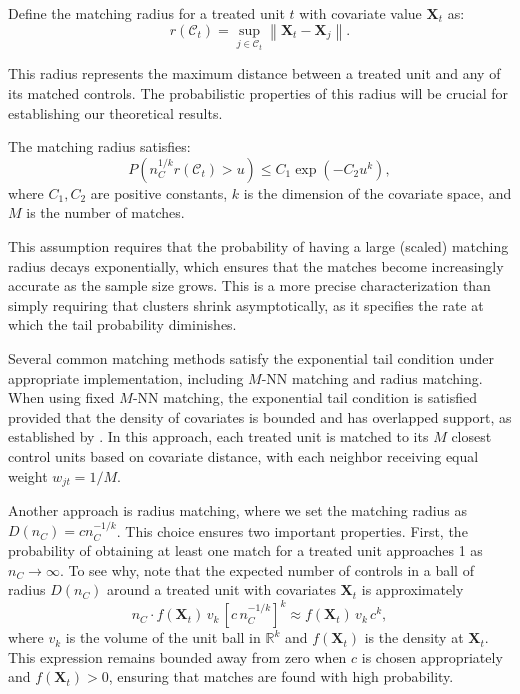 \documentclass{mytemplate}
\begin{document}
Define the matching radius for a treated unit $t$ with covariate value $\mathbf{X}_t$ as:
\[
r\left(\mathcal{C}_t\right)=\sup _{j \in \mathcal{C}_t}\left\|\mathbf{X}_t - \mathbf{X}_j\right\|.
\]

This radius represents the maximum distance between a treated unit and any of its matched controls. The probabilistic properties of this radius will be crucial for establishing our theoretical results.

\begin{assumption}
\label{assum:exponential-tail}
The matching radius satisfies:
\[
P\left(n_C^{1/k}r\left(\mathcal{C}_t\right) > u\right) \leq C_1  \exp\left(-C_2 u^k\right),
\]
where $C_1, C_2$ are positive constants, $k$ is the dimension of the covariate space, and $M$ is the number of matches.
\end{assumption}

This assumption requires that the probability of having a large (scaled) matching radius decays exponentially, which ensures that the matches become increasingly accurate as the sample size grows. This is a more precise characterization than simply requiring that clusters shrink asymptotically, as it specifies the rate at which the tail probability diminishes.


Several common matching methods satisfy the exponential tail condition under appropriate implementation, including $M$-NN matching and radius matching. When using fixed $M$-NN matching, the exponential tail condition is satisfied provided that the density of covariates is bounded and has overlapped support, as established by \cite{abadie2006large}. In this approach, each treated unit is matched to its $M$ closest control units based on covariate distance, with each neighbor receiving equal weight $w_{jt} = 1/M$. 

Another approach is radius matching, where we set the matching radius as $D(n_C) = c n_C^{-1/k}$. This choice ensures two important properties. First, the probability of obtaining at least one match for a treated unit approaches 1 as $n_C \rightarrow \infty$. To see why, note that the expected number of controls in a ball of radius $D(n_C)$ around a treated unit with covariates $\mathbf{X}_t$ is approximately
\[
n_C \cdot f(\mathbf{X}_t)\, v_k\,[c\,n_C^{-1/k}]^k \approx f(\mathbf{X}_t)\,v_k\,c^k,
\]
where $v_k$ is the volume of the unit ball in $\mathbb{R}^k$ and $f(\mathbf{X}_t)$ is the density at $\mathbf{X}_t$. This expression remains bounded away from zero when $c$ is chosen appropriately and $f(\mathbf{X}_t) > 0$, ensuring that matches are found with high probability.
\end{document}
